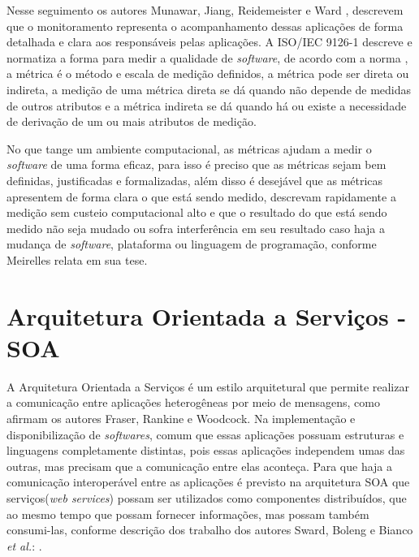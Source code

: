 Nesse seguimento os autores Munawar, Jiang, Reidemeister e Ward  \cite{5298441}, descrevem que o monitoramento representa o acompanhamento dessas aplicações de forma detalhada e clara aos responsáveis pelas aplicações. A ISO/IEC 9126-1 \cite{associaccao2003nbr} descreve e normatiza a forma para medir a qualidade de \textit{software}, de acordo com a norma \cite{associaccao2003nbr}, a métrica é o método e escala de medição definidos, a métrica pode ser direta ou indireta, a medição de uma métrica direta se dá quando não depende de medidas de outros atributos e a métrica indireta se dá quando há ou existe a necessidade de derivação de um ou mais atributos de medição.

No que tange um ambiente computacional, as métricas ajudam a medir o \textit{software} de uma forma eficaz, para isso é preciso que as métricas sejam bem definidas, justificadas e formalizadas, além disso é desejável que as métricas apresentem de forma clara o que está sendo medido, descrevam rapidamente a medição sem custeio computacional alto e que o resultado do que está sendo medido não seja mudado ou sofra interferência em seu resultado caso haja a mudança de \textit{software}, plataforma ou linguagem de programação, conforme Meirelles \cite{meirelles2013monitoramento} relata em sua tese.


\section{Arquitetura Orientada a Serviços - SOA}

A Arquitetura Orientada a Serviços é um estilo arquitetural que permite realizar a comunicação entre aplicações heterogêneas por meio de mensagens, como afirmam os autores Fraser, Rankine e Woodcock\cite{fraser2007service}. Na implementação e disponibilização de \textit{softwares}, comum que essas aplicações possuam estruturas e linguagens completamente distintas, pois essas aplicações independem umas das outras, mas precisam que a comunicação entre elas aconteça. Para que haja a comunicação interoperável entre as aplicações é previsto na arquitetura \acrshort{SOA} que serviços(\textit{web services}) possam ser utilizados como componentes distribuídos, que ao mesmo tempo que possam fornecer informações, mas possam também consumi-las, conforme descrição dos trabalho dos autores Sward,  Boleng e Bianco \textit{et al.}: \cite{sward2011service,bianco2011architecting}.

